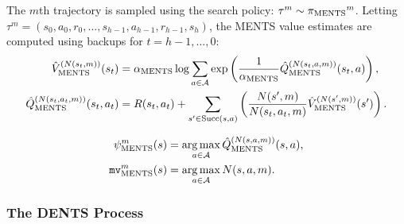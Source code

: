     The $m$th trajectory is sampled using the search policy: $\tau^m \sim {\pi_{{\textnormal{MENTS}}}}^m$. Letting $\tau^m=(s_0,a_0,r_0,...,s_{h-1},a_{h-1},r_{h-1},s_{h})$, the MENTS value estimates are computed using backups for $t=h-1, ..., 0$: 
    \begin{align}
        {\hat{V}^{(N(s_t,m))}_{{\textnormal{MENTS}}}}(s_t) &= 
            {\alpha_{{\textnormal{MENTS}}}} \log \sum_{a\in\mathcal{A}} \exp \left(
                \frac{1}{{\alpha_{{\textnormal{MENTS}}}}}{\hat{Q}^{(N(s_t,a,m))}_{{\textnormal{MENTS}}}}(s_t,a) \right), \label{appeq:soft_v_backup} \\
        {\hat{Q}^{(N(s_t,a_t,m))}_{{\textnormal{MENTS}}}}(s_t,a_t) &= 
            R(s_t,a_t) + \sum_{s'\in{\textnormal{Succ}(s,a)}} \left( 
                \frac{N(s',m)}{N(s_t,a_t,m)} {\hat{V}^{(N(s',m))}_{{\textnormal{MENTS}}}}(s') \right). \label{appeq:soft_q_backup}
    \end{align}


    \begin{align}
        \psi^{m}_{{\textnormal{MENTS}}}(s) &= \operatorname*{arg\,max}_{a\in\mathcal{A}}{\hat{Q}^{(N(s,a,m))}_{{\textnormal{MENTS}}}}(s,a), \\
        {\texttt{mv}^{m}_{{\textnormal{MENTS}}}}(s) &= \operatorname*{arg\,max}_{a\in\mathcal{A}} N(s,a,m).
    \end{align}










\subsubsection{The DENTS Process}


